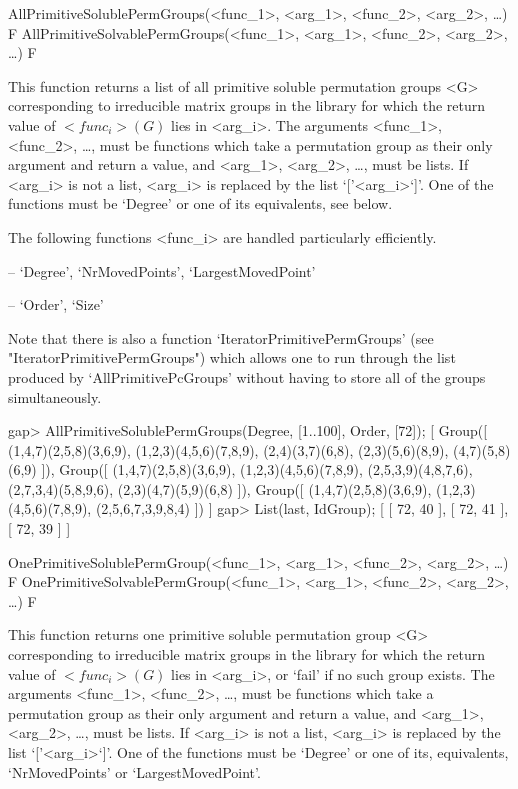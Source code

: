 \null


\>AllPrimitiveSolublePermGroups(<func_1>, <arg_1>, <func_2>, <arg_2>, \dots) F
\>AllPrimitiveSolvablePermGroups(<func_1>, <arg_1>, <func_2>, <arg_2>, \dots) F

This function returns a list of all primitive soluble permutation
groups <G> corresponding to irreducible matrix groups in the  {\IRREDSOL} library 
for which the return value of $<func_i>(G)$ lies
in <arg_i>.  The arguments <func_1>, <func_2>, \dots,
must be {\GAP} functions which take a permutation group as their only argument and return a
value, and <arg_1>, <arg_2>,
\dots,  must be lists. If <arg_i> is not a list, <arg_i> is replaced by the list
`['<arg_i>`]'. One of the functions must be `Degree' or one of its
equivalents, see below.

The following functions <func_i> are handled particularly efficiently. 

\beginlist

\item{--} `Degree', `NrMovedPoints', `LargestMovedPoint'
\item{--} `Order', `Size'
\endlist

Note that there is also a function `IteratorPrimitivePermGroups' (see
"IteratorPrimitivePermGroups") which allows one to run through the list produced by
`AllPrimitivePcGroups' without having to store all of the groups
simultaneously.

\beginexample
gap> AllPrimitiveSolublePermGroups(Degree, [1..100], Order, [72]);
[ Group([ (1,4,7)(2,5,8)(3,6,9), (1,2,3)(4,5,6)(7,8,9), (2,4)(3,7)(6,8), 
      (2,3)(5,6)(8,9), (4,7)(5,8)(6,9) ]), 
  Group([ (1,4,7)(2,5,8)(3,6,9), (1,2,3)(4,5,6)(7,8,9), (2,5,3,9)(4,8,7,6), 
      (2,7,3,4)(5,8,9,6), (2,3)(4,7)(5,9)(6,8) ]), 
  Group([ (1,4,7)(2,5,8)(3,6,9), (1,2,3)(4,5,6)(7,8,9), (2,5,6,7,3,9,8,4) ]) ]
gap> List(last, IdGroup);
[ [ 72, 40 ], [ 72, 41 ], [ 72, 39 ] ]
\endexample


\>OnePrimitiveSolublePermGroup(<func_1>, <arg_1>, <func_2>, <arg_2>, \dots) F
\>OnePrimitiveSolvablePermGroup(<func_1>, <arg_1>, <func_2>, <arg_2>, \dots) F

This function returns one primitive soluble permutation
group <G> corresponding to irreducible matrix groups in the  {\IRREDSOL} library 
for which the return value of $<func_i>(G)$ lies in
<arg_i>, or `fail' if no such group exists.  The arguments <func_1>, <func_2>, \dots,
must be {\GAP} functions which take a permutation group as their only argument and return a
value, and <arg_1>, <arg_2>,
\dots,  must be lists. If <arg_i> is not a list, <arg_i> is replaced by the list
`['<arg_i>`]'. One of the functions must be `Degree' or one of its, equivalents, `NrMovedPoints' or `LargestMovedPoint'.

